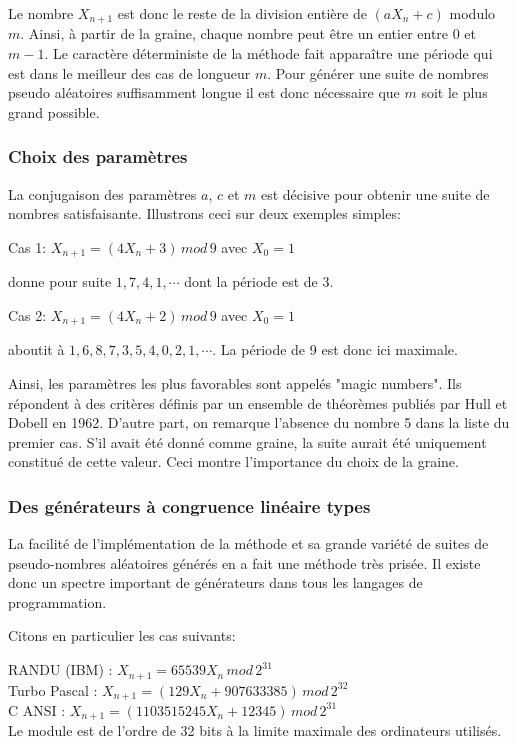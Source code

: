 \documentclass{scrartcl}
\begin{document}
Le nombre $X_{n+1}$ est donc le reste de la division entière de $(a X_n +c)$
modulo $m$. Ainsi, à partir de la graine, chaque nombre peut être un entier
entre 0 et $m-1$.  Le caractère déterministe de la méthode fait apparaître une
période qui est dans le meilleur des cas de longueur $m$.  Pour générer une
suite de nombres pseudo aléatoires suffisamment longue il est donc nécessaire
que $m$ soit le plus grand possible.

\subsubsection{Choix des paramètres}
La conjugaison des paramètres $a$, $c$ et $m$ est décisive pour obtenir une
suite de nombres satisfaisante. Illustrons ceci sur deux exemples simples:\par

Cas 1: $X_{n+1} = (4 X_n + 3)\, mod\, 9$ avec $X_0 = 1$\par
donne pour suite $1,7,4,1, \cdots$ dont la période est de 3.\par
Cas 2: $X_{n+1} = (4 X_n +2)\, mod\, 9$ avec $X_0 = 1$\par
aboutit à $1,6,8,7,3,5,4,0,2,1, \cdots$. La période de 9 est donc ici maximale.\par

Ainsi, les paramètres les plus favorables sont appelés "magic numbers". Ils
répondent à des critères définis par un ensemble de théorèmes publiés par Hull
et Dobell en 1962.  D'autre part, on remarque l'absence du nombre 5 dans la
liste du premier cas. S'il avait été donné comme graine, la suite aurait été
uniquement constitué de cette valeur. Ceci montre l'importance du choix de la
graine.

\subsubsection{Des générateurs à congruence linéaire types}\label{ss:randu}

La facilité de l'implémentation de la méthode et sa grande variété de suites de
pseudo-nombres aléatoires générés en a fait une méthode très prisée.  Il existe
donc un spectre important de générateurs dans tous les langages de
programmation.\par
Citons en particulier les cas suivants:\par
RANDU (IBM) : $X_{n+1} =65539 X_{n}\, mod\, 2^{31}$\\
Turbo Pascal : $X_{n+1} =(129 X_{n} + 907633385)\, mod\, 2^{32}$\\
C ANSI : $X_{n+1} =(1103515245 X_{n}+12345)\, mod\, 2^{31}$\\
Le module est de l'ordre de 32 bits à la limite maximale des ordinateurs
utilisés.
\end{document}
